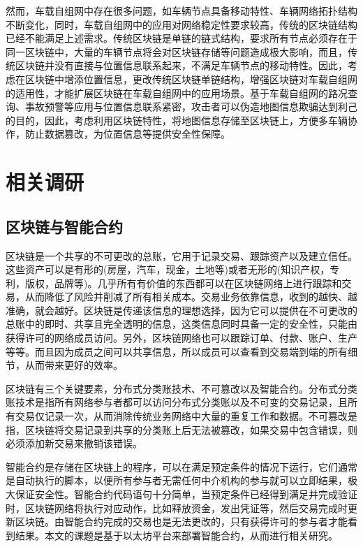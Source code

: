 然而，车载自组网中存在很多问题，如车辆节点具备移动特性、车辆网络拓扑结构不断变化，同时，车载自组网中的应用对网络稳定性要求较高，传统的区块链结构已经不能满足上述需求\cite{liu2019kalman}。传统区块链是单链的链式结构，要求所有节点必须存在于同一区块链中，大量的车辆节点将会对区块链存储等问题造成极大影响，而且，传统区块链并没有直接与位置信息联系起来，不满足车辆节点的移动特性。因此，考虑在区块链中增添位置信息，更改传统区块链单链结构，增强区块链对车载自组网的适用性，才能扩展区块链在车载自组网中的应用场景。基于车载自组网的路况查询、事故预警等应用与位置信息联系紧密，攻击者可以伪造地图信息欺骗达到利己的目的，因此，考虑利用区块链特性，将地图信息存储至区块链上，方便多车辆协作，防止数据篡改，为位置信息等提供安全性保障\cite{yang2019maritime}。

\section{相关调研}
\subsection{区块链与智能合约}
区块链是一个共享的不可更改的总账，它用于记录交易、跟踪资产以及建立信任\cite{王震2019面向大数据应用的区块链解决方案综述}。这些资产可以是有形的(房屋，汽车，现金，土地等)或者无形的(知识产权，专利，版权，品牌等)。几乎所有有价值的东西都可以在区块链网络上进行跟踪和交易，从而降低了风险并削减了所有相关成本。交易业务依靠信息，收到的越快、越准确，就会越好。区块链是传递该信息的理想选择，因为它可以提供在不可更改的总账中的即时、共享且完全透明的信息，这类信息同时具备一定的安全性，只能由获得许可的网络成员访问。另外，区块链网络也可以跟踪订单、付款、账户、生产等等。而且因为成员之间可以共享信息，所以成员可以查看到交易端到端的所有细节，从而带来更好的效率。

区块链有三个关键要素，分布式分类账技术、不可篡改以及智能合约。分布式分类账技术是指所有网络参与者都可以访问分布式分类账以及不可变的交易记录，且所有交易仅记录一次，从而消除传统业务网络中大量的重复工作和数据。不可篡改是指，区块链将交易记录到共享的分类账上后无法被篡改，如果交易中包含错误，则必须添加新交易来撤销该错误。

智能合约是存储在区块链上的程序，可以在满足预定条件的情况下运行，它们通常是自动执行的脚本，以便所有参与者无需任何中介机构的参与就可以立即结果，极大保证安全性。智能合约代码语句十分简单，当预定条件已经得到满足并完成验证时，区块链网络将执行对应动作，比如释放资金，发出凭证等，然后交易完成时更新区块链。由智能合约完成的交易也是无法更改的，只有获得许可的参与者才能看到结果。本文的课题是基于以太坊平台来部署智能合约，从而进行相关研究。

